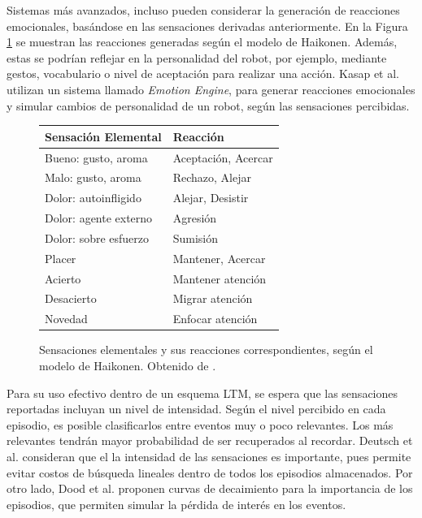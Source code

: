 Sistemas más avanzados, incluso pueden considerar la generación de reacciones emocionales, basándose en las sensaciones derivadas anteriormente. En la Figura \ref{img:emotional_haikonen} se muestran las reacciones generadas según el modelo de Haikonen. Además, estas se podrían reflejar en la personalidad del robot, por ejemplo, mediante gestos, vocabulario o nivel de aceptación para realizar una acción. Kasap et al. \cite{Kasap2010} utilizan un sistema llamado \textit{Emotion Engine}, para generar reacciones emocionales y simular cambios de personalidad de un robot, según las sensaciones percibidas.

\begin{figure}[H]
\centering
\begin{tabular}{| l | l |}
\hline
\rowcolor{gray!50}
Sensación Elemental & Reacción  \\ 
\hline Bueno: gusto, aroma & Aceptación, Acercar \\ 
\hline Malo: gusto, aroma & Rechazo, Alejar \\ 
\hline Dolor: autoinfligido  & Alejar, Desistir \\ 
\hline Dolor: agente externo & Agresión \\ 
\hline Dolor: sobre esfuerzo & Sumisión \\ 
\hline Placer & Mantener, Acercar \\ 
\hline Acierto & Mantener atención \\ 
\hline Desacierto & Migrar atención \\ 
\hline Novedad & Enfocar atención \\ 
\hline 
\end{tabular} 
\caption{\small Sensaciones elementales y sus reacciones correspondientes, según el modelo de Haikonen. Obtenido de \cite{Dodd2005}.}
\label{img:emotional_haikonen}
\end{figure}


Para su uso efectivo dentro de un esquema LTM, se espera que las sensaciones reportadas incluyan un nivel de intensidad. Según el nivel percibido en cada episodio, es posible clasificarlos entre eventos muy o poco relevantes. Los más relevantes tendrán mayor probabilidad de ser recuperados al recordar. Deutsch et al.  \cite{Deutsch2008} consideran que el la intensidad de las sensaciones es importante, pues permite evitar costos de búsqueda lineales dentro de todos los episodios almacenados. Por otro lado, Dood et al. proponen curvas de decaimiento para la importancia de los episodios, que permiten simular la pérdida de interés en los eventos.


